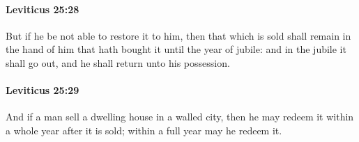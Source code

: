 		\paragraph{Leviticus 25:28} %
			\label{LEVITICUS-25-28}

			But if he be not able to restore it to him, then that which is sold shall remain in the hand of him that hath bought it until the year of jubile: and in the jubile it shall go out, and he shall return unto his possession.


		\paragraph{Leviticus 25:29} %
			\label{LEVITICUS-25-29}

			And if a man sell a dwelling house in a walled city, then he may redeem it within a whole year after it is sold; within a full year may he redeem it.


